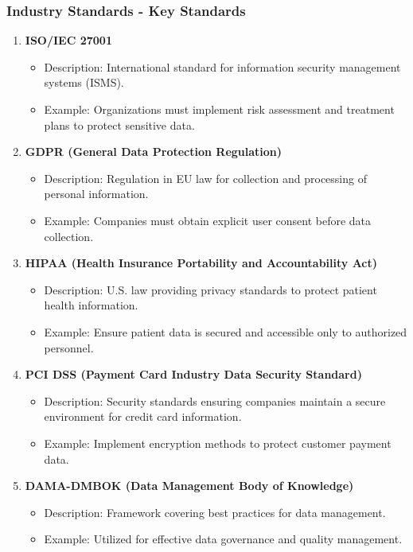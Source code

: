 \documentclass[aspectratio=169]{beamer}
\begin{document}
\begin{frame}[fragile]
    \frametitle{Industry Standards - Key Standards}
    \begin{enumerate}
        \item \textbf{ISO/IEC 27001}
            \begin{itemize}
                \item Description: International standard for information security management systems (ISMS).
                \item Example: Organizations must implement risk assessment and treatment plans to protect sensitive data.
            \end{itemize}

        \item \textbf{GDPR (General Data Protection Regulation)}
            \begin{itemize}
                \item Description: Regulation in EU law for collection and processing of personal information.
                \item Example: Companies must obtain explicit user consent before data collection.
            \end{itemize}

        \item \textbf{HIPAA (Health Insurance Portability and Accountability Act)}
            \begin{itemize}
                \item Description: U.S. law providing privacy standards to protect patient health information.
                \item Example: Ensure patient data is secured and accessible only to authorized personnel.
            \end{itemize}

        \item \textbf{PCI DSS (Payment Card Industry Data Security Standard)}
            \begin{itemize}
                \item Description: Security standards ensuring companies maintain a secure environment for credit card information.
                \item Example: Implement encryption methods to protect customer payment data.
            \end{itemize}

        \item \textbf{DAMA-DMBOK (Data Management Body of Knowledge)}
            \begin{itemize}
                \item Description: Framework covering best practices for data management.
                \item Example: Utilized for effective data governance and quality management.
            \end{itemize}
    \end{enumerate}
\end{frame}
\end{document}
